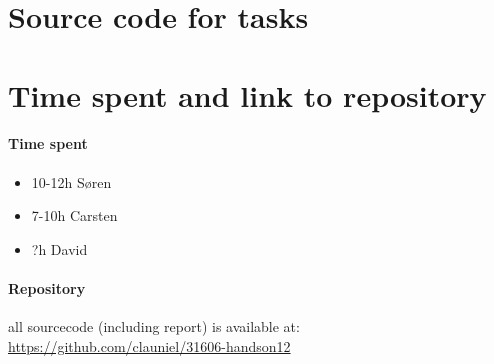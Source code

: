 \section{Source code for tasks}







\section{Time spent and link to repository}

\paragraph{ Time spent }
\begin{itemize}
  \item 10-12h Søren
  \item 7-10h Carsten
  \item ?h David
\end{itemize}

\paragraph{ Repository }
all sourcecode (including report) is available at:
\url{ https://github.com/clauniel/31606-handson12 }